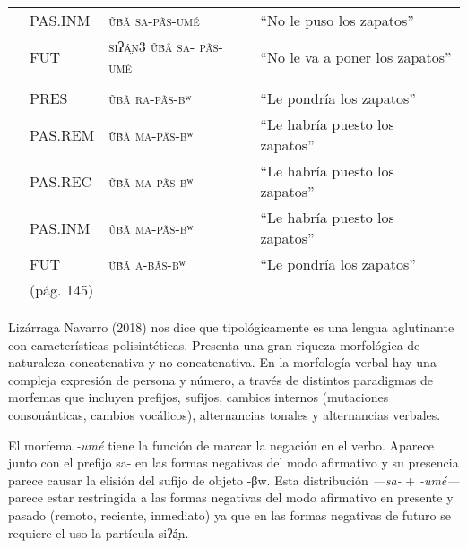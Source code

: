 {\begin{tabular}{rlrr}
                                 & PAS.INM    & \multicolumn{1}{l}{\textsc{ṹβ̃ã sa-pã́s-umé}}         & \multicolumn{1}{l}{“No le puso los zapatos”}       \\
                                 & FUT        & \multicolumn{1}{l}{\textsc{siʔá̤n3 ṹβ̃ã sa- pã́s-umé}} & \multicolumn{1}{l}{“No le va a poner los zapatos”} \\
                                 &            &                                                     &                                                    \\
                                 & PRES       & \multicolumn{1}{l}{\textsc{ṹβ̃ã ra-pã́s-βʷ}}          & \multicolumn{1}{l}{“Le pondría los zapatos”}       \\
                                 & PAS.REM    & \multicolumn{1}{l}{\textsc{ṹβ̃ã ma-pã́s-βʷ}}          & \multicolumn{1}{l}{“Le habría puesto los zapatos”} \\
                                 & PAS.REC    & \multicolumn{1}{l}{\textsc{ṹβ̃ã ma-pã́s-βʷ}}          & \multicolumn{1}{l}{“Le habría puesto los zapatos”} \\
                                 & PAS.INM    & \multicolumn{1}{l}{\textsc{ṹβ̃ã ma-pã́s-βʷ}}          & \multicolumn{1}{l}{“Le habría puesto los zapatos”} \\
                                 & FUT        & \multicolumn{1}{l}{\textsc{ṹβ̃ã a-βã́s-βʷ}}           & \multicolumn{1}{l}{“Le pondría los zapatos”}       \\
                                 & (pág. 145) &                                                     &                                                    \\
    \end{tabular}
} \vspace{1cm}

Lizárraga Navarro (2018) nos dice que tipológicamente es una lengua aglutinante con características polisintéticas. Presenta una gran riqueza morfológica de naturaleza concatenativa y no concatenativa. En la morfología verbal hay una compleja expresión de persona y número, a través de distintos paradigmas de morfemas que incluyen prefijos, sufijos, cambios internos (mutaciones consonánticas, cambios vocálicos), alternancias tonales y alternancias verbales.

El morfema \textit{-umé} tiene la función de marcar la negación en el verbo. Aparece junto con el prefijo sa- en las formas negativas del modo afirmativo y su presencia parece causar la elisión del sufijo de objeto {\setmainfont{Doulos SIL}-βw}. Esta distribución \textit{—sa-} + \textit{-umé—} parece estar restringida a las formas negativas del modo afirmativo en presente y pasado (remoto, reciente, inmediato) ya que en las formas negativas de futuro se requiere el uso la partícula {\setmainfont{Doulos SIL}siʔá̤n.}
